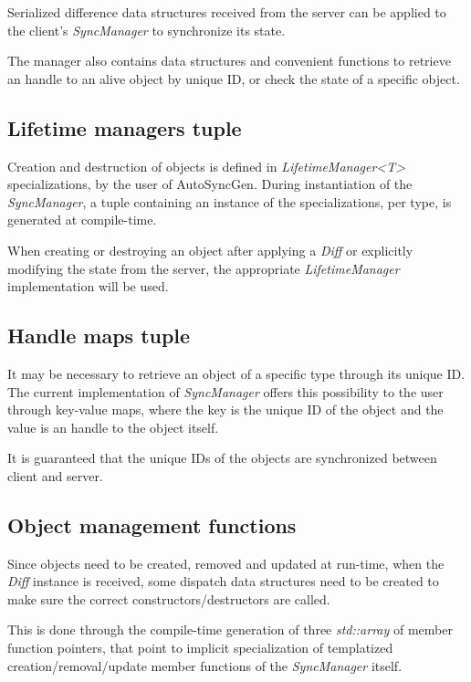 \documentclass{report}
\begin{document}
            Serialized difference data structures received from the server can be applied to the client's \emph{SyncManager} to synchronize its state.

            The manager also contains data structures and convenient functions to retrieve an handle to an alive object by unique ID, or check the state of a specific object.

            \subsection{Lifetime managers tuple}

                Creation and destruction of objects is defined in \emph{LifetimeManager<T>} specializations, by the user of AutoSyncGen.
                During instantiation of the \emph{SyncManager}, a tuple containing an instance of the specializations, per type, is generated at compile-time.

                When creating or destroying an object after applying a \emph{Diff} or explicitly modifying the state from the server, the appropriate \emph{LifetimeManager} implementation will be used.

            \subsection{Handle maps tuple}

                It may be necessary to retrieve an object of a specific type through its unique ID. The current implementation of \emph{SyncManager} offers this possibility to the user through key-value maps, where the key is the unique ID of the object and the value is an handle to the object itself.

                It is guaranteed that the unique IDs of the objects are synchronized between client and server.

            \subsection{Object management functions}

                Since objects need to be created, removed and updated at run-time, when the \emph{Diff} instance is received, some dispatch data structures need to be created to make sure the correct constructors/destructors are called.

                This is done through the compile-time generation of three \emph{std::array} of member function pointers, that point to implicit specialization of templatized creation/removal/update member functions of the \emph{SyncManager} itself.
\end{document}
